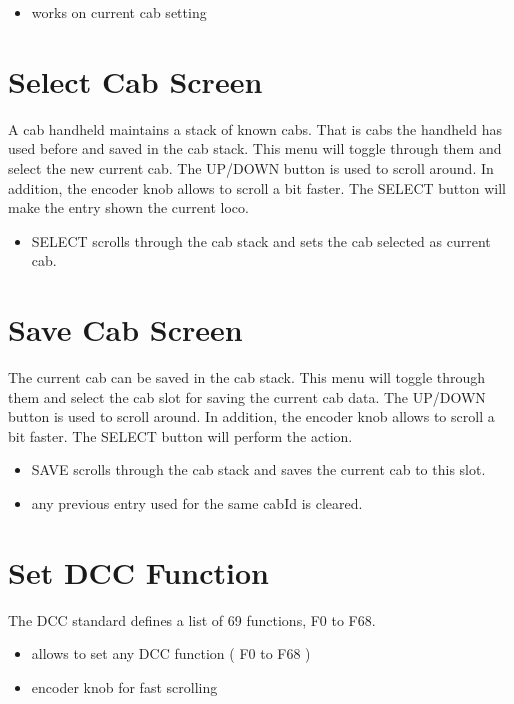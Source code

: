 \begin{itemize}
\item works on current cab setting
\end{itemize}


\section{Select Cab Screen}

A cab handheld maintains a stack of known cabs. That is cabs the handheld has used before and saved in the cab stack. This menu will toggle through them and select the new current cab. The UP/DOWN button is used to scroll around. In addition, the encoder knob allows to scroll a bit faster. The SELECT button will make the entry shown the current loco.

\begin{itemize}
\item SELECT scrolls through the cab stack and sets the cab selected as current cab.
\end{itemize}

\section{Save Cab Screen}

The current cab can be saved in the cab stack. This menu will toggle through them and select the cab slot for saving the current cab data. The UP/DOWN button is used to scroll around. In addition, the encoder knob allows to scroll a bit faster. The SELECT button will perform the action.

\begin{itemize}
\item SAVE scrolls through the cab stack and saves the current cab to this slot.
\item any previous entry used for the same cabId is cleared.
\end{itemize}


\section{Set DCC Function}

The DCC standard defines a list of 69 functions, F0 to F68.

\begin{itemize}
\item allows to set any DCC function ( F0 to F68 )
\item encoder knob for fast scrolling
\end{itemize}

